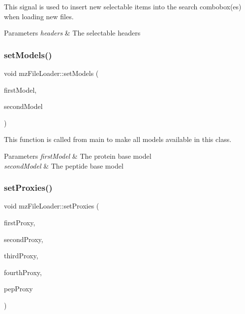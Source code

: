 This signal is used to insert new selectable items into the search combobox(es) when loading new files. 


\begin{DoxyParams}{Parameters}
{\em headers} & The selectable headers \\
\hline
\end{DoxyParams}
\mbox{\label{classmz_file_loader_a699254cd8dabbf7fda70f02aa06730f7}} 
\subsubsection{\texorpdfstring{set\+Models()}{setModels()}}
{\footnotesize\ttfamily void mz\+File\+Loader\+::set\+Models (\begin{DoxyParamCaption}\item[{Q\+Standard\+Item\+Model $\ast$}]{first\+Model,  }\item[{Q\+Standard\+Item\+Model $\ast$}]{second\+Model }\end{DoxyParamCaption})\hspace{0.3cm}{\ttfamily [inline]}}



This function is called from main to make all models available in this class. 


\begin{DoxyParams}{Parameters}
{\em first\+Model} & The protein base model \\
\hline
{\em second\+Model} & The peptide base model \\
\hline
\end{DoxyParams}
\mbox{\label{classmz_file_loader_a515cf8ce62e8c7c235a62536e739cb9d}} 
\subsubsection{\texorpdfstring{set\+Proxies()}{setProxies()}}
{\footnotesize\ttfamily void mz\+File\+Loader\+::set\+Proxies (\begin{DoxyParamCaption}\item[{Q\+Sort\+Filter\+Proxy\+Model $\ast$}]{first\+Proxy,  }\item[{Q\+Sort\+Filter\+Proxy\+Model $\ast$}]{second\+Proxy,  }\item[{Q\+Sort\+Filter\+Proxy\+Model $\ast$}]{third\+Proxy,  }\item[{Q\+Sort\+Filter\+Proxy\+Model $\ast$}]{fourth\+Proxy,  }\item[{Q\+Sort\+Filter\+Proxy\+Model $\ast$}]{pep\+Proxy }\end{DoxyParamCaption})\hspace{0.3cm}{\ttfamily [inline]}}




